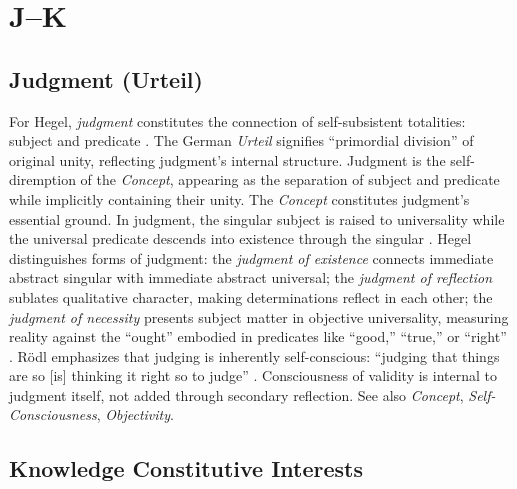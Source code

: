 \documentclass{book}
\begin{document}
\chapter{J--K}

\section{Judgment (Urteil)}

For Hegel, \textit{judgment} constitutes the connection of self-subsistent totalities: subject and predicate \parencite[553]{Hegel:2014aa}. The German \textit{Urteil} signifies ``primordial division'' of original unity, reflecting judgment's internal structure. Judgment is the self-diremption of the \textit{Concept}, appearing as the separation of subject and predicate while implicitly containing their unity. The \textit{Concept} constitutes judgment's essential ground. In judgment, the singular subject is raised to universality while the universal predicate descends into existence through the singular \parencite[554]{Hegel:2014aa}. Hegel distinguishes forms of judgment: the \textit{judgment of existence} connects immediate abstract singular with immediate abstract universal; the \textit{judgment of reflection} sublates qualitative character, making determinations reflect in each other; the \textit{judgment of necessity} presents subject matter in objective universality, measuring reality against the ``ought'' embodied in predicates like ``good,'' ``true,'' or ``right'' \parencite[578]{Hegel:2014aa}. R\"odl emphasizes that judging is inherently self-conscious: ``judging that things are so [is] thinking it right so to judge'' \parencite[39]{Rodl:2018aa}. Consciousness of validity is internal to judgment itself, not added through secondary reflection. See also \textit{Concept}, \textit{Self-Consciousness}, \textit{Objectivity}.

\section{Knowledge Constitutive Interests}
\end{document}
